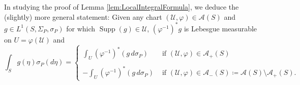 \documentclass[smallextended]{svjour3}
\theoremstyle{remark}
\newcommand\supp{\operatorname{Supp}}
\begin{document}
\begin{remark}\label{rmk:LocalIntegralFormula}
In studying the proof of Lemma \ref{lem:LocalIntegralFormula}, we deduce the (slightly) more general statement: Given any chart $(\mathcal{U},\varphi)\in\mathcal{A}(S)$ and $g\in L^1(S,\Sigma_P,\sigma_P)$ for which $\supp(g)\in\mathcal{U}$, $(\varphi^{-1})^*g$ is Lebesgue measurable on $U=\varphi(\mathcal{U})$ and 
\begin{equation*}
    \int_S g(\eta)\sigma_P(d\eta)=\begin{cases}
    \displaystyle\int_U(\varphi^{-1})^*(g\,d\sigma_P) &\mbox{ if }(\mathcal{U},\varphi)\in\mathcal{A}_+(S)\\
    &\\
    -\displaystyle\int_U(\varphi^{-1})^*(g\,d\sigma_P)&\mbox{ if }(\mathcal{U},\varphi)\in\mathcal{A}_-(S)\coloneqq\mathcal{A}(S)\setminus\mathcal{A}_+(S).
    \end{cases}
\end{equation*}
\end{remark}
\end{document}
